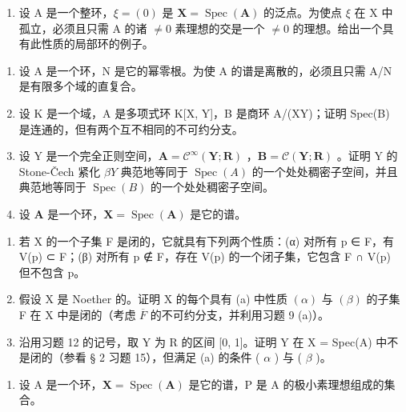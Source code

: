 \begin{enumerate}
\def\labelenumi{(\alph{enumi})}
\setcounter{enumi}{1}
\tightlist
\item
  设 A 是一个整环，\(\xi = (0)\) 是 \(\mathbf{X} = \operatorname{Spec}(\mathbf{A})\) 的泛点。为使点 \(\xi\) 在 X 中孤立，必须且只需 A 的诸 \(\neq 0\) 素理想的交是一个 \(\neq 0\) 的理想。给出一个具有此性质的局部环的例子。
\end{enumerate}

\begin{enumerate}
\def\labelenumi{\arabic{enumi}.}
\setcounter{enumi}{9}
\item
  设 A 是一个环，N 是它的幂零根。为使 A 的谱是离散的，必须且只需 A/N 是有限多个域的直复合。
\item
  设 K 是一个域，A 是多项式环 K{[}X, Y{]}，B 是商环 A/(XY)；证明 Spec(B) 是连通的，但有两个互不相同的不可约分支。
\item
  设 Y 是一个完全正则空间，\(\mathbf{A} = \mathcal{C}^{\infty}(\mathbf{Y}; \mathbf{R})\) ，\(\mathbf{B} = \mathcal{C}(\mathbf{Y}; \mathbf{R})\) 。证明 Y 的 Stone-Čech 紧化 \(\beta Y\) 典范地等同于 \(\operatorname{Spec}(A)\) 的一个处处稠密子空间，并且典范地等同于 \(\operatorname{Spec}(B)\) 的一个处处稠密子空间。
\item
  设 \(\mathbf{A}\) 是一个环，\(\mathbf{X} = \operatorname{Spec}(\mathbf{A})\) 是它的谱。
\end{enumerate}

\begin{enumerate}
\def\labelenumi{(\alph{enumi})}
\item
  若 X 的一个子集 F 是闭的，它就具有下列两个性质：(α) 对所有 p ∈ F，有 V(p) ⊂ F；(β) 对所有 p ∉ F，存在 V(p) 的一个闭子集，它包含 F ∩ V(p) 但不包含 p。
\item
  假设 X 是 Noether 的。证明 X 的每个具有 (a) 中性质 \((\alpha)\) 与 \((\beta)\) 的子集 F 在 X 中是闭的（考虑 \(\overline{F}\) 的不可约分支，并利用习题 9 (a)）。
\item
  沿用习题 12 的记号，取 Y 为 R 的区间 {[}0, 1{]}。证明 Y 在 X = Spec(A) 中不是闭的（参看 § 2 习题 15），但满足 (a) 的条件 ( \(\alpha\) ) 与 ( \(\beta\) )。
\end{enumerate}

\begin{enumerate}
\def\labelenumi{\arabic{enumi}.}
\setcounter{enumi}{13}
\tightlist
\item
  设 A 是一个环，\(\mathbf{X} = \operatorname{Spec}(\mathbf{A})\) 是它的谱，P 是 A 的极小素理想组成的集合。
\end{enumerate}

